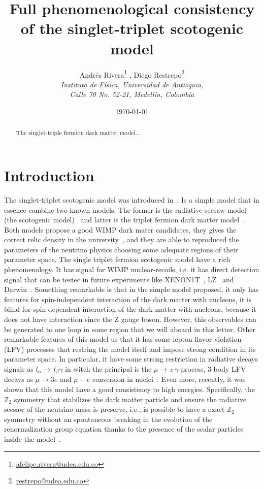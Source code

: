 \documentclass[12pt,letterpaper]{article}
\title{
Full phenomenological consistency of the singlet-triplet scotogenic model
}
\author{ 
    Andrés Rivera\footnote{\href{mailto:afelipe.rivera@udea.edu.co}{afelipe.rivera@udea.edu.co}}
   , Diego Restrepo\footnote{\href{mailto:restrepo@udea.edu.co}{restrepo@udea.edu.co}}
    \\
\textit{\small  Instituto de F\'{i}sica, Universidad de Antioquia,} \\
\textit{\small  Calle 70 No. 52-21, Medell\'{i}n, Colombia}
}
\date{\small \today}
\begin{document}
\maketitle
\begin{abstract}
The singlet-triple fermion dark matter model...

\end{abstract}



\section{Introduction}



The singlet-triplet scotogenic model was introduced in~\cite{Hirsch:2013ola}.
Is a simple model that in essence combine two known models. The former is the radiative seesaw model (the scotogenic model)~\cite{Ma:2006km} and latter is the triplet fermion dark matter model~\cite{Ma:2008cu}. Both models propose a good WIMP dark mater candidates, they gives the correct relic density in the university~\cite{Aghanim:2018eyx}, and they are able to reproduced the parameters of the neutrino physics choosing some adequate regions of their parameter space. 
The single triplet fermion scotogenic model have a rich phenomenology. 
It has signal for WIMP nuclear-recoils, i.e. it has direct detection signal that can be testec in future experiments like XENON1T~\cite{Aprile:2018dbl}, LZ~\cite{Mount:2017qzi} and Darwin~\cite{Aalbers:2016jon}. Something remarkable is that in the simple model proposed, it only has features for spin-independent interaction of the dark matter with nucleons, it is blind for spin-dependent interaction of the dark matter with nucleons, because it does not have interaction since the Z gauge boson. However, this observables can be generated to one loop in some region that we will aboard in this letter.
%
Other remarkable features of this model us that it has some lepton flavor violation (LFV) processes that restring the model itself and impose strong condition in its parameter space. In particular, it have some strong restriction in radiative decays signals as $l_{\alpha}\to\,l_{\beta}\gamma$ in witch the principal is the $\mu\to\,e\,\gamma$ process, 3-body LFV decays as $\mu\to 3 e$ and $\mu - e$ conversion in nuclei~\cite{Rocha-Moran:2016enp}.  
%
Even more, recently, it was shown that this model have a good consistency to high energies. Specifically, the $\mathbb{Z}_2$ symmetry that stabilizes the dark matter particle and ensure the radiative seesaw of the neutrino mass is preserve, i.e., is possible to have a exact $\mathbb{Z}_2$ symmetry without an spontaneous breaking in the evolution of the renormalization group equation thanks to the presence of the scalar particles inside the model~\cite{Merle:2016scw}.
\end{document}
